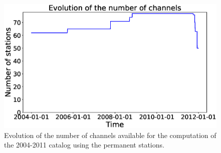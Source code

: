 \documentclass[draft]{agujournal2019}
\begin{document}
\begin{figure}[hbt!]
\noindent\includegraphics[width=\textwidth, trim={0cm 0cm 0cm 0cm},clip]{figures/timeline_perm.eps}
\caption{Evolution of the number of channels available for the computation of the 2004-2011 catalog using the permanent stations.}
\label{pngfiguresample}
\end{figure}

\newpage
\end{document}

